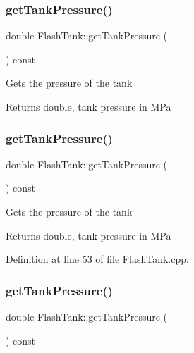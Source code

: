 \subsubsection{\texorpdfstring{get\+Tank\+Pressure()}{getTankPressure()}\hspace{0.1cm}{\footnotesize\ttfamily [1/3]}}
{\footnotesize\ttfamily double Flash\+Tank\+::get\+Tank\+Pressure (\begin{DoxyParamCaption}{ }\end{DoxyParamCaption}) const}

Gets the pressure of the tank \begin{DoxyReturn}{Returns}
double, tank pressure in M\+Pa 
\end{DoxyReturn}
\mbox{\label{class_flash_tank_af5d4f0bf7babe61120e1e4452594e1af}} 
\subsubsection{\texorpdfstring{get\+Tank\+Pressure()}{getTankPressure()}\hspace{0.1cm}{\footnotesize\ttfamily [2/3]}}
{\footnotesize\ttfamily double Flash\+Tank\+::get\+Tank\+Pressure (\begin{DoxyParamCaption}{ }\end{DoxyParamCaption}) const}

Gets the pressure of the tank \begin{DoxyReturn}{Returns}
double, tank pressure in M\+Pa 
\end{DoxyReturn}


Definition at line 53 of file Flash\+Tank.\+cpp.

\mbox{\label{class_flash_tank_af5d4f0bf7babe61120e1e4452594e1af}} 
\subsubsection{\texorpdfstring{get\+Tank\+Pressure()}{getTankPressure()}\hspace{0.1cm}{\footnotesize\ttfamily [3/3]}}
{\footnotesize\ttfamily double Flash\+Tank\+::get\+Tank\+Pressure (\begin{DoxyParamCaption}{ }\end{DoxyParamCaption}) const}

